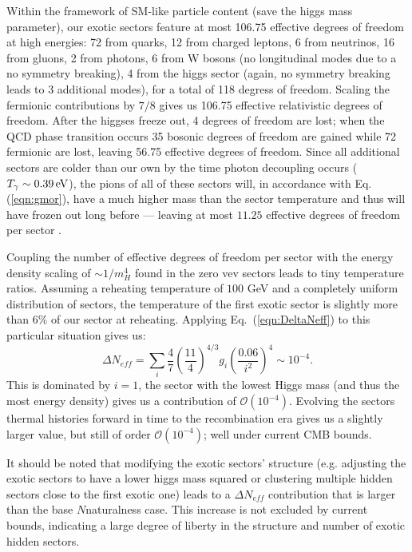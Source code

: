 \documentclass[nofootinbib,twocolumn,preprintnumbers]{revtex4-1}
\begin{document}
Within the framework of SM-like particle content (save the higgs mass parameter), our exotic sectors feature at most 106.75 effective degrees of freedom at high energies: 72 from quarks,  12 from charged leptons, 6 from neutrinos, 16 from gluons, 2 from photons, 6 from W bosons (no longitudinal modes due to a no symmetry breaking), 4 from the higgs sector (again, no symmetry breaking leads to 3 additional modes), for a total of 118 degress of freedom. Scaling the fermionic contributions by $7/8$ gives us 106.75 effective relativistic degrees of freedom.  After the higgses freeze out, 4 degrees of freedom are lost; when the QCD phase transition occurs 35 bosonic degrees of freedom are gained while 72 fermionic are lost, leaving 56.75 effective degrees of freedom. Since all additional sectors are colder than our own  by the time photon decoupling occurs ($T_\gamma \sim 0.39 \,{\rm eV}$), the pions of all of these sectors will, in accordance with Eq. (\ref{eqn:gmor}), have a much higher mass than the sector temperature and thus will have frozen out long before --- leaving at most $11.25$ effective degrees of freedom per sector  .

Coupling the number of effective degrees of freedom per sector with the energy density scaling of $\sim 1/m_H^4$ found in the zero vev sectors leads to tiny temperature ratios. Assuming a reheating temperature of $100$ GeV and a completely uniform distribution of sectors, the temperature of the first exotic sector is slightly more than $6\%$ of our sector at reheating. Applying Eq.~(\ref{eqn:DeltaNeff}) to this particular situation gives us:
\begin{equation}
\Delta N_{eff} = \sum_i \frac{4}{7}\left(\frac{11}{4}\right)^{4/3}g_{i} \left(\frac{0.06}{i^2}\right)^4 \sim 10^{-4}.
\end{equation}     
 This is dominated by $i=1$, the sector with the lowest Higgs mass (and thus the most energy density) gives us a contribution of $\mathcal{O} (10^{-4})$. Evolving the sectors thermal histories forward in time to the recombination era gives us a slightly larger value, but still of order $\mathcal{O}(10^{-4})$; well under current CMB bounds. 

It should be noted that modifying the exotic sectors' structure (e.g. adjusting the exotic sectors to have a lower higgs mass squared or clustering multiple hidden sectors close to the first exotic one) leads to a $\Delta N_{eff}$ contribution that is larger than the base $N$naturalness case. This increase is not excluded by current bounds, indicating a large degree of liberty in the structure and number of exotic hidden sectors.
\end{document}
